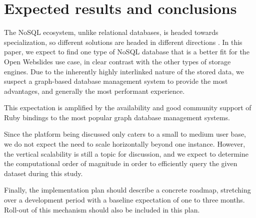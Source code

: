 \documentclass[fleqn,10pt]{voorstel}
\begin{document}
\section{Expected results and conclusions}
\label{sec:expected_results_and_conclusions}

The NoSQL ecosystem, unlike relational databases, is headed towards specialization, so different solutions are headed in different directions \autocite{Maroo2013}. In this paper, we expect to find one type of NoSQL database that is a better fit for the Open Webslides use case, in clear contrast with the other types of storage engines. Due to the inherently highly interlinked nature of the stored data, we suspect a graph-based database management system to provide the most advantages, and generally the most performant experience.

This expectation is amplified by the availability and good community support of Ruby bindings to the most popular graph database management systems.

Since the platform being discussed only caters to a small to medium user base, we do not expect the need to scale horizontally beyond one instance. However, the vertical scalability is still a topic for discussion, and we expect to determine the computational order of magnitude in order to efficiently query the given dataset during this study.

Finally, the implementation plan should describe a concrete roadmap, stretching over a development period with a baseline expectation of one to three months. Roll-out of this mechanism should also be included in this plan.


\nocite{KaurRani2013}

\printbibliography[heading=bibintoc]
\end{document}
